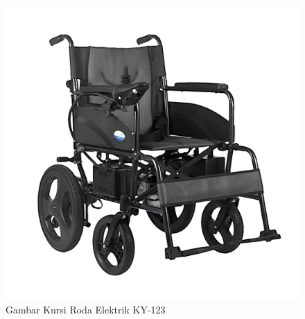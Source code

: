 \begin{figure}[H]
  \centering

  \includegraphics[scale=0.3]{gambar/Kursi Roda Elektrik Lipat OneHealth KY123 A.jpg}

  \caption{Gambar Kursi Roda Elektrik KY-123}
  \label{fig:roketluarangkasa}
\end{figure}


